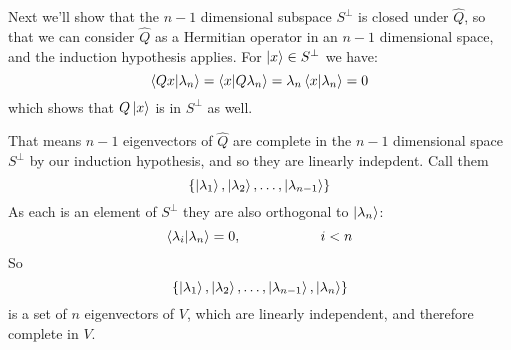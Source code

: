 \documentclass[12pt]{book}
\begin{document}
Next we'll show that the $n-1$ dimensional subspace $S^\perp$ is closed under $\hat{Q}$, so that 
we can consider $\hat{Q}$ as a Hermitian operator in an $n-1$ dimensional space, and the induction hypothesis applies.  For $\ket{x} \in S^\perp$ we have:
$$\braket{Qx|\lambda_n} = \braket{x| Q\lambda_n} = \lambda_n \braket{x|\lambda_n} = 0$$
which shows that $Q\ket{x}$ is in $S^\perp$ as well.  

That means $n-1$ eigenvectors of $\hat{Q}$ are complete in the $n-1$
dimensional space $S^\perp$ by our induction hypothesis, and so they
are linearly indepdent.  Call them
$$\{\ket{\lambda_1},\ket{\lambda_2}, \ldots, \ket{\lambda_{n-1}}\}$$
As each is an element of $S^\perp$ they are also orthogonal to $\ket{\lambda_n}$:
$$\braket{\lambda_i|\lambda_n} = 0, \hspace{2cm} i<n$$
So
$$\{\ket{\lambda_1}, \ket{\lambda_2}, \ldots, \ket{\lambda_{n-1}}, \ket{\lambda_n}\}$$
is a set of $n$ eigenvectors of $V$, which are linearly independent, and therefore complete in $V$.
\end{document}
